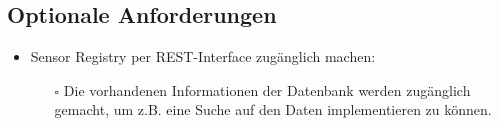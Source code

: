 \documentclass[fontsize=11pt,a4paper]{scrartcl}
\begin{document}
\subsection{Optionale Anforderungen}

\begin{itemize}
\item Sensor Registry per REST-Interface zugänglich machen:
    \begin{itemize}
    \item[$\square$] Die vorhandenen Informationen der Datenbank werden zugänglich gemacht, um z.B. eine Suche auf den Daten implementieren zu können.
    \end{itemize}
\end{itemize}
\end{document}

